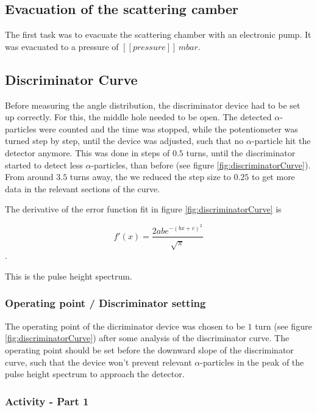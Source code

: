 \documentclass[a4paper]{article}
\begin{document}
\subsection{Evacuation of the scattering camber}

The first task was to evacuate the scattering chamber with an electronic pump. It was evacuated to a pressure of $[[pressure]] \, mbar$.

\subsection{Discriminator Curve}

Before measuring the angle distribution, the discriminator device had to be set up correctly. For this, the middle hole needed to be open. The detected $\alpha$-particles were counted and the time was stopped, while the potentiometer was turned step by step, until the device was adjusted, such that no $\alpha$-particle hit the detector anymore. This was done in steps of $0.5$ turns, until the discriminator started to detect less $\alpha$-particles, than before (see figure \ref{fig:discriminatorCurve}). From around $3.5$ turns away, the we reduced the step size to $0.25$ to get more data in the relevant sections of the curve.

The derivative of the error function fit in figure \ref{fig:discriminatorCurve} is

\begin{equation}
f'(x) = \frac{2 a b e^{-(b x + c)^2}}{\sqrt{\pi}}
\label{eq:gaussian}
\end{equation}.

This is the pulse height spectrum.

\subsubsection{Operating point / Discriminator setting}
\label{sec:operating_point}

The operating point of the dicriminator device was chosen to be $1$ turn (see figure \ref{fig:discriminatorCurve}) after some analysis of the discriminator curve. The operating point should be set before the downward slope of the discriminator curve, such that the device won't prevent relevant $\alpha$-particles in the peak of the pulse height spectrum to approach the detector.

\subsubsection{Activity - Part 1}
\end{document}
